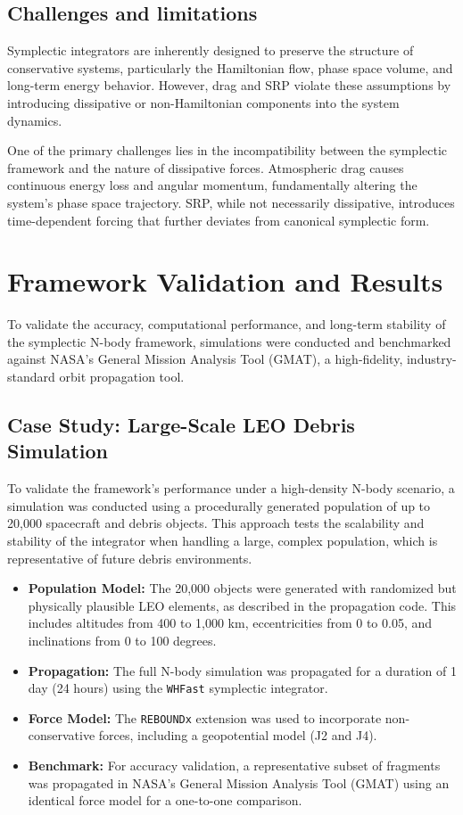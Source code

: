\documentclass[letterpaper, paper,11pt]{AAS}
\begin{document}
\subsection*{Challenges and limitations}

Symplectic integrators are inherently designed to preserve the structure of conservative systems, particularly the Hamiltonian flow, phase space volume, and long-term energy behavior. However, drag and SRP violate these assumptions by introducing dissipative or non-Hamiltonian components into the system dynamics.

One of the primary challenges lies in the incompatibility between the symplectic framework and the nature of dissipative forces. Atmospheric drag causes continuous energy loss and angular momentum, fundamentally altering the system's phase space trajectory. SRP, while not necessarily dissipative, introduces time-dependent forcing that further deviates from canonical symplectic form.

\section{Framework Validation and Results}
To validate the accuracy, computational performance, and long-term stability of the symplectic N-body framework, simulations were conducted and benchmarked against NASA's General Mission Analysis Tool (GMAT), a high-fidelity, industry-standard orbit propagation tool.

\subsection{Case Study: Large-Scale LEO Debris Simulation}
To validate the framework's performance under a high-density N-body scenario, a simulation was conducted using a procedurally generated population of up to 20,000 spacecraft and debris objects. This approach tests the scalability and stability of the integrator when handling a large, complex population, which is representative of future debris environments.

\begin{itemize}
    \item \textbf{Population Model:} The 20,000 objects were generated with randomized but physically plausible LEO elements, as described in the propagation code. This includes altitudes from 400 to 1,000 km, eccentricities from 0 to 0.05, and inclinations from 0 to 100 degrees.
    \item \textbf{Propagation:} The full N-body simulation was propagated for a duration of 1 day (24 hours) using the \texttt{WHFast} symplectic integrator.
    \item \textbf{Force Model:} The \texttt{REBOUNDx} extension was used to incorporate non-conservative forces, including a geopotential model (J2 and J4).
    \item \textbf{Benchmark:} For accuracy validation, a representative subset of fragments was propagated in NASA's General Mission Analysis Tool (GMAT) using an identical force model for a one-to-one comparison.
\end{itemize}
\end{document}
